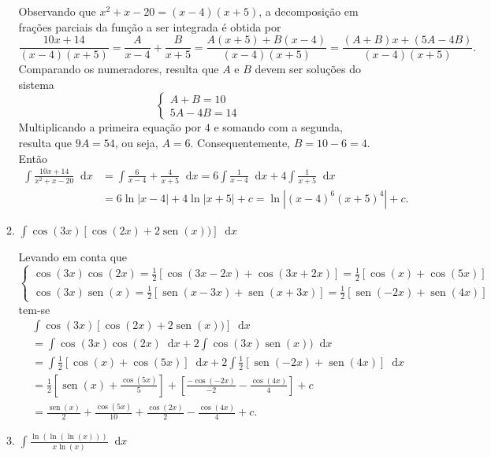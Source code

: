 \documentclass[12pt,a4paper]{article}
\newcommand*\diff{\mathop{}\!\mathrm{d}}
\newcommand*\sen{\operatorname{sen}}
\newcommand*\abs[1]{\left|#1\right|}
\begin{document}
\begin{enumerate}
\begin{enumerate}
Observando que $x^2 + x - 20 = (x-4)(x+5)$, a decomposição em frações parciais da função a ser integrada é obtida por
\[
\frac{10 x + 14}{(x-4)(x+5)}
= \frac{A}{x-4} + \frac{B}{x+5}
= \frac{A(x+5) + B(x-4)}{(x-4)(x+5)}
= \frac{(A+B)x +(5A-4B)}{(x-4)(x+5)}.
\]
Comparando os numeradores, resulta que $A$ e $B$ devem ser soluções do sistema
\[
\begin{cases}
A + B = 10 \\
5A - 4B = 14
\end{cases}
\]
Multiplicando a primeira equação por $4$ e somando com a segunda, resulta que $9A = 54$, ou seja, $A=6$. Consequentemente, $B = 10-6 = 4$. Então
\begin{align*}
\int \frac{10 x+14}{x^2+x-20} \diff x
& = \int \frac{6}{x-4} + \frac{4}{x+5} \diff x
  = 6 \int \frac{1}{x-4} \diff x + 4 \int \frac{1}{x+5} \diff x \\
& = 6 \ln\abs{ x-4 } + 4 \ln\abs{x+5} + c
  = \ln\abs{ (x-4)^6 (x+5)^4} + c.
\end{align*}

\item $\displaystyle \int \cos(3x)\left[ \cos(2x)+2\sen(x)) \right] \diff x$

Levando em conta que
\[
\begin{cases}
\cos(3x)\cos(2x) = \frac{1}{2} \left[ \cos(3x-2x) +\cos(3x+2x) \right]
                 = \frac{1}{2} \left[ \cos(x)+\cos(5x) \right] \\
\cos(3x)\sen(x) = \frac{1}{2} \left[ \sen(x-3x) +\sen(x+3x) \right]
                = \frac{1}{2} \left[ \sen(-2x)+\sen(4x) \right]
\end{cases}
\]
tem-se
\begin{align*}
&\int \cos(3x)\left[ \cos(2x)+2\sen(x)) \right] \diff x \\
& = \int \cos(3x)\cos(2x) \diff x + 2 \int \cos(3x)\sen(x)) \diff x \\
& = \int \frac{1}{2} \left[ \cos(x)+\cos(5x) \right] \diff x
+ 2 \int \frac{1}{2} \left[ \sen(-2x)+\sen(4x) \right] \diff x \\
& = \frac{1}{2}\left[ \sen(x) + \frac{\cos(5x)}{5} \right] +
    \left[ \frac{ -\cos(-2x)}{-2} - \frac{\cos(4x)}{4} \right] + c \\
& = \frac{\sen(x)}{2} + \frac{\cos(5x)}{10} +
 \frac{ \cos(2x)}{2} - \frac{\cos(4x)}{4} + c.
\end{align*}

\item $\displaystyle \int \frac{ \ln(\ln(\ln(x))) }{ x \ln(x) } \diff x$


\end{enumerate}
\end{enumerate}
\end{document}
